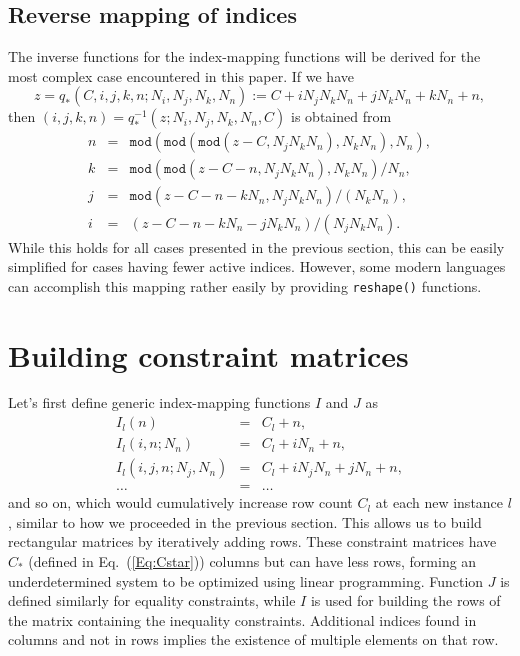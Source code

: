 \documentclass{report}[fleqn,11pt]
\begin{document}
\section{Reverse mapping of indices}
The inverse functions for the index-mapping functions will be derived for the
most complex case encountered in this paper.
If we have
\begin{equation}
	z = q_*(C, i, j, k, n; N_i, N_j, N_k, N_n) := C + iN_jN_kN_n + jN_kN_n + kN_n + n,
\end{equation}
then $(i, j, k, n) = q_*^{-1}(z; N_i, N_j, N_k, N_n, C)$ is obtained from
\begin{eqnarray}
	n &=& \texttt{mod}(\texttt{mod}(\texttt{mod}(z - C, N_jN_kN_n), N_kN_n), N_n), \nonumber \\
	k &=& \texttt{mod}(\texttt{mod}(z - C - n, N_jN_kN_n), N_kN_n)/N_n, \nonumber \\
	j &=& \texttt{mod}(z - C - n - kN_n, N_jN_kN_n)/(N_kN_n), \nonumber \\
	i &=& (z - C - n - kN_n - jN_kN_n)/(N_jN_kN_n).
\end{eqnarray}
While this holds for all cases presented in the previous section, this can be easily simplified
for cases having fewer active indices. However, some modern languages can accomplish this
mapping rather easily by providing \texttt{reshape()} functions.

\chapter{Building constraint matrices}
Let's first define generic index-mapping functions $I$ and $J$ as
\begin{eqnarray}
	\label{Eq:Offsets}
	I_l(n) &=& C_l + n, \nonumber \\
	I_l(i, n; N_n) &=& C_l + iN_n + n, \nonumber \\
	I_l(i, j, n; N_j, N_n) &=& C_l + iN_j N_n + jN_n +n, \\
	\ldots &=& \ldots \nonumber
\end{eqnarray}
and so on, which would cumulatively increase row count $C_l$ at each new instance $l$,
similar to how we proceeded in the previous section.
This allows us to build rectangular matrices by iteratively adding rows.
These constraint matrices have $C_*$ (defined in Eq.~(\ref{Eq:Cstar}))
columns but can have less rows,
forming an underdetermined system to be optimized using linear programming.
Function $J$ is defined similarly for equality constraints, while $I$ is used
for building the rows of the matrix containing the inequality constraints.
Additional indices found in columns and not in rows implies the existence of multiple elements on that row. 
\end{document}
